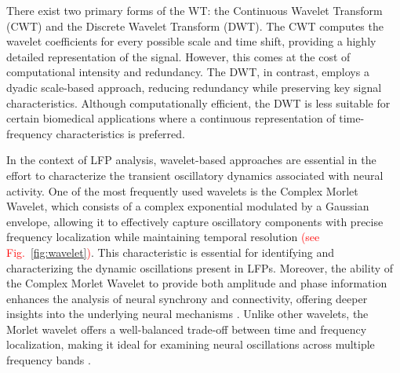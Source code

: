\documentclass{article}
\begin{document}
There exist two primary forms of the WT: the Continuous Wavelet Transform (CWT) and the Discrete Wavelet Transform (DWT). The CWT computes the wavelet coefficients for every possible scale and time shift, providing a highly detailed representation of the signal. However, this comes at the cost of computational intensity and redundancy. The DWT, in contrast, employs a dyadic scale-based approach, reducing redundancy while preserving key signal characteristics. Although computationally efficient, the DWT is less suitable for certain biomedical applications where a continuous representation of time-frequency characteristics is preferred.

In the context of LFP analysis, wavelet-based approaches are essential in the effort to characterize the transient oscillatory dynamics associated with neural activity. One of the most frequently used wavelets is the Complex Morlet Wavelet, which consists of a complex exponential modulated by a Gaussian envelope, allowing it to effectively capture oscillatory components with precise frequency localization while maintaining temporal resolution \textcolor{red}{(see Fig.~\ref{fig:wavelet})}. This characteristic is essential for identifying and characterizing the dynamic oscillations present in LFPs. Moreover, the ability of the Complex Morlet Wavelet to provide both amplitude and phase information enhances the analysis of neural synchrony and connectivity, offering deeper insights into the underlying neural mechanisms \cite{lopour2013}. Unlike other wavelets, the Morlet wavelet offers a well-balanced trade-off between time and frequency localization, making it ideal for examining neural oscillations across multiple frequency bands \cite{cohen2019}.
\end{document}
